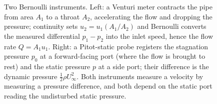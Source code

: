 \begin{figure}[htbp]
\begin{tikzpicture}[
  wall/.style={draw=engblack, very thick},
  stream/.style={draw=engblue, -{Stealth}, thick},
  tap/.style={draw=engred, thick},
  label/.style={font=\scriptsize},
]
\end{tikzpicture}
\caption[Venturi meter and Pitot-static probe]{Two Bernoulli
instruments. Left: a Venturi meter contracts the pipe from area
$A_1$ to a throat $A_2$, accelerating the flow and dropping the
pressure; continuity sets $u_2 = u_1(A_1/A_2)$ and Bernoulli converts
the measured differential $p_1 - p_2$ into the inlet speed, hence the
flow rate $Q = A_1 u_1$. Right: a Pitot-static probe registers the
stagnation pressure $p_0$ at a forward-facing port (where the flow is
brought to rest) and the static pressure $p$ at a side port; their
difference is the dynamic pressure $\tfrac{1}{2}\rho U_\infty^2$.
Both instruments measure a velocity by measuring a pressure
difference, and both depend on the static port reading the
undisturbed static pressure.}
\label{fig:vol03ch11:venturi-pitot}
\end{figure}
